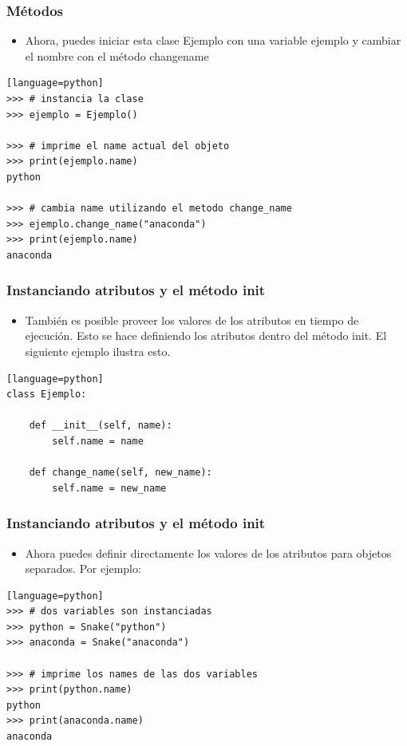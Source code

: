 \documentclass[hyperref={pdfpagelabels=false},xcolor=pst,pdf,fragile]{beamer}
\begin{document}
\begin{frame}[fragile]
    \frametitle{Métodos}
    \pause
    \begin{itemize}
    \item Ahora, puedes iniciar esta clase Ejemplo con una variable ejemplo y cambiar el nombre con el método change\textunderscore name
    \end{itemize}
    \begin{lstlisting}[basicstyle=\tiny][language=python]
>>> # instancia la clase
>>> ejemplo = Ejemplo()

>>> # imprime el name actual del objeto 
>>> print(ejemplo.name)
python

>>> # cambia name utilizando el metodo change_name
>>> ejemplo.change_name("anaconda")
>>> print(ejemplo.name)
anaconda
    \end{lstlisting}
    
\end{frame}

\begin{frame}[fragile]
    \frametitle{Instanciando atributos y el método init}
    \pause
    \begin{itemize}
    \item También es posible proveer los valores de los atributos en tiempo de ejecución. Esto se hace definiendo los atributos dentro del método init. El siguiente ejemplo ilustra esto.
    \end{itemize}
    \begin{lstlisting}[basicstyle=\tiny][language=python]
class Ejemplo:

    def __init__(self, name):
        self.name = name

    def change_name(self, new_name):
        self.name = new_name
    \end{lstlisting}
\end{frame}


\begin{frame}[fragile]
    \frametitle{Instanciando atributos y el método init}
    \pause
    \begin{itemize}
    \item Ahora puedes definir directamente los valores de los atributos para objetos separados. Por ejemplo:
    \end{itemize}
    \begin{lstlisting}[basicstyle=\tiny][language=python]
>>> # dos variables son instanciadas
>>> python = Snake("python")
>>> anaconda = Snake("anaconda")

>>> # imprime los names de las dos variables
>>> print(python.name)
python
>>> print(anaconda.name)
anaconda
    \end{lstlisting}
\end{frame}
\end{document}
